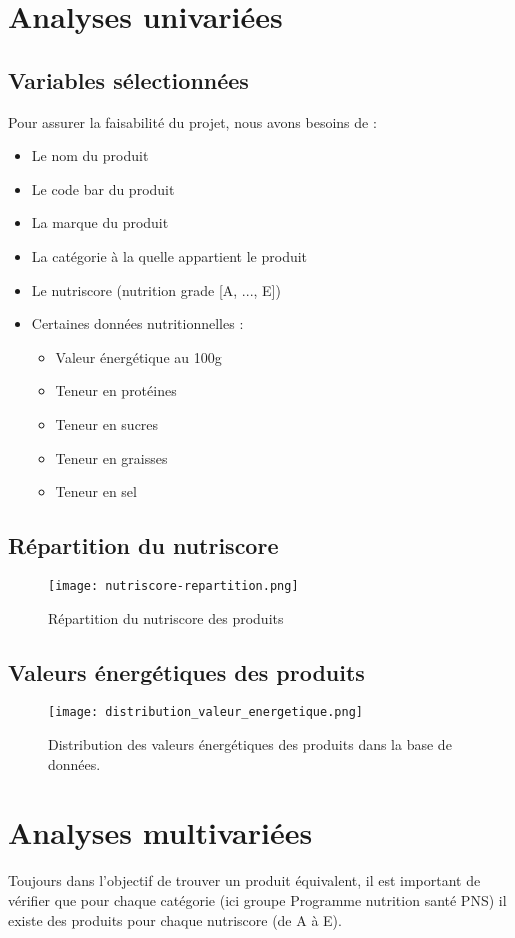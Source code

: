 \section{Analyses univariées}

  \subsection{Variables sélectionnées}
  Pour assurer la faisabilité du projet, nous avons besoins de :
  \begin{itemize}
    \item Le nom du produit
    \item Le code bar du produit
    \item La marque du produit
    \item La catégorie à la quelle appartient le produit
    \item Le nutriscore (nutrition grade [A, ..., E])
    \item Certaines données nutritionnelles :
    \begin{itemize}
      \item Valeur énergétique au 100g
      \item Teneur en protéines
      \item Teneur en sucres
      \item Teneur en graisses
      \item Teneur en sel
    \end{itemize}
  \end{itemize}
  \subsection{Répartition du nutriscore}
  \begin{figure}[H]
    \texttt{[image: nutriscore-repartition.png]}
    \caption{Répartition du nutriscore des produits}
    \label{nutriscore_pie}
  \end{figure}

  \subsection{Valeurs énergétiques des produits}
  \begin{figure}[H]
    \texttt{[image: distribution\_valeur\_energetique.png]}
    \caption{Distribution des valeurs énergétiques des produits dans la base
    de données.}
    \label{}
  \end{figure}
\section{Analyses multivariées}
Toujours dans l'objectif de trouver un produit équivalent, il est important
de vérifier que pour chaque catégorie (ici groupe Programme nutrition santé PNS)
il existe des produits pour chaque nutriscore (de A à E).

